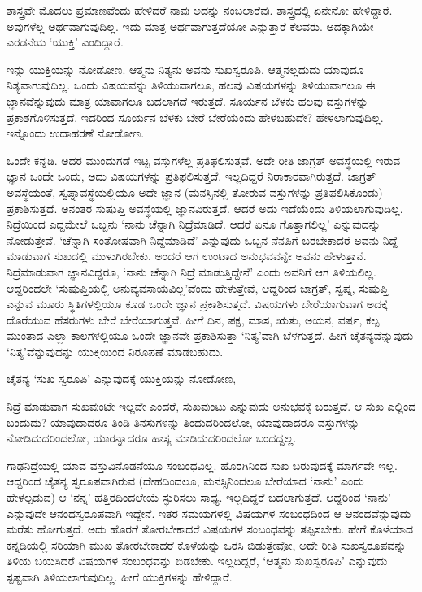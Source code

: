ಶಾಸ್ತ್ರವೇ ಮೊದಲು ಪ್ರಮಾಣವೆಂದು ಹೇಳಿದರೆ ನಾವು ಅದನ್ನು ನಂಬಲಾರೆವು. ಶಾಸ್ತ್ರದಲ್ಲಿ ಏನೇನೋ ಹೇಳಿದ್ದಾರೆ. ಅವುಗಳೆಲ್ಲ ಅರ್ಥವಾಗುವುದಿಲ್ಲ. ಇದು ಮಾತ್ರ ಅರ್ಥವಾಗುತ್ತದೆಯೋ ಎನ್ನುತ್ತಾರೆ ಕೆಲವರು. ಅದಕ್ಕಾಗಿಯೇ ಎರಡನೆಯ `ಯುಕ್ತಿ' ಎಂದಿದ್ದಾರೆ.

ಇನ್ನು ಯುಕ್ತಿಯನ್ನು ನೋಡೋಣ. ಆತ್ಮನು ನಿತ್ಯನು ಅವನು ಸುಖಸ್ವರೂಪಿ. ಆತ್ಮನಲ್ಲದುದು ಯಾವುದೂ ನಿತ್ಯವಾಗುವುದಿಲ್ಲ. ಒಂದು ವಿಷಯವನ್ನು ತಿಳಿಯುವಾಗಲೂ, ಹಲವು ವಿಷಯಗಳನ್ನು ತಿಳಿಯುವಾಗಲೂ ಈ ಜ್ಞಾನವೆನ್ನುವುದು ಮಾತ್ರ ಯಾವಾಗಲೂ ಬದಲಾಗದೆ ಇರುತ್ತದೆ. ಸೂರ್ಯನ ಬೆಳಕು ಹಲವು ವಸ್ತುಗಳನ್ನು ಪ್ರಕಾಶಗೊಳಿಸುತ್ತದೆ. ಇದರಿಂದ ಸೂರ್ಯನ ಬೆಳಕು ಬೇರೆ ಬೇರೆಯೆಂದು ಹೇಳಬಹುದೇ? ಹೇಳಲಾಗುವುದಿಲ್ಲ. ಇನ್ನೊಂದು ಉದಾಹರಣೆ ನೋಡೋಣ.

ಒಂದೇ ಕನ್ನಡಿ. ಅದರ ಮುಂದುಗಡೆ ಇಟ್ಟ ವಸ್ತುಗಳೆಲ್ಲ ಪ್ರತಿಫಲಿಸುತ್ತವೆ. ಅದೇ ರೀತಿ ಜಾಗ್ರತ್ ಅವಸ್ಥೆಯಲ್ಲಿ ಇರುವ ಜ್ಞಾನ ಒಂದೇ ಒಂದು, ಅದು ವಿಷಯಗಳನ್ನು ಪ್ರತಿಫಲಿಸುತ್ತದೆ. ಇಲ್ಲದಿದ್ದರೆ ನಿರಾಕಾರವಾಗಿರುತ್ತದೆ. ಜಾಗ್ರತ್ ಅವಸ್ಥೆಯಂತೆ, ಸ್ವಪ್ನಾವಸ್ಥೆಯಲ್ಲಿಯೂ ಅದೇ ಜ್ಞಾನ (ಮನಸ್ಸಿನಲ್ಲಿ ತೋರುವ ವಸ್ತುಗಳನ್ನು ಪ್ರತಿಫಲಿಸಿಕೊಂಡು) ಪ್ರಕಾಶಿಸುತ್ತದೆ. ಅನಂತರ ಸುಷುಪ್ತಿ ಅವಸ್ಥೆಯಲ್ಲಿ ಜ್ಞಾನವಿರುತ್ತದೆ. ಆದರೆ ಅದು ಇದೆಯೆಂದು ತಿಳಿಯಲಾಗುವುದಿಲ್ಲ. ನಿದ್ರೆಯಿಂದ ಎದ್ದಮೇಲೆ ಒಬ್ಬನು `ನಾನು ಚೆನ್ನಾಗಿ ನಿದ್ರೆಮಾಡಿದೆ. ಆದರೆ ಏನೂ ಗೊತ್ತಾಗಲಿಲ್ಲ' ಎನ್ನುವುದನ್ನು ನೋಡುತ್ತೇವೆ. `ಚೆನ್ನಾಗಿ ಸಂತೋಷವಾಗಿ ನಿದ್ದೆಮಾಡಿದೆ' ಎನ್ನುವುದು ಒಬ್ಬನ ನೆನಪಿಗೆ ಬರಬೇಕಾದರೆ ಅವನು ನಿದ್ದೆ ಮಾಡುವಾಗ ಸುಖದಲ್ಲಿ ಮುಳುಗಿರಬೇಕು. ಅಂದರೆ ಆಗ ಉಂಟಾದ ಅನುಭವವನ್ನೇ ಅವನು ಹೇಳುತ್ತಾನೆ. ನಿದ್ರೆಮಾಡುವಾಗ ಜ್ಞಾನವಿದ್ದರೂ, `ನಾನು ಚೆನ್ನಾಗಿ ನಿದ್ರೆ ಮಾಡುತ್ತಿದ್ದೇನೆ' ಎಂದು ಅವನಿಗೆ ಆಗ ತಿಳಿಯಲಿಲ್ಲ. ಆದ್ದರಿಂದಲೇ `ಸುಷುಪ್ತಿಯಲ್ಲಿ ಅನುವ್ಯವಸಾಯವಿಲ್ಲ'ವೆಂದು ಹೇಳುತ್ತೇವೆ, ಆದ್ದರಿಂದ ಜಾಗ್ರತ್, ಸ್ವಪ್ನ, ಸುಷುಪ್ತಿ ಎನ್ನುವ ಮೂರು ಸ್ಥಿತಿಗಳಲ್ಲಿಯೂ ಕೂಡ ಒಂದೇ ಜ್ಞಾನ ಪ್ರಕಾಶಿಸುತ್ತದೆ. ವಿಷಯಗಳು ಬೇರೆಯಾಗುವಾಗ ಅದಕ್ಕೆ ದೊರೆಯುವ ಹೆಸರುಗಳು ಬೇರೆ ಬೇರೆಯಾಗುತ್ತವೆ. ಹೀಗೆ ದಿನ, ಪಕ್ಷ, ಮಾಸ, ಋತು, ಅಯನ, ವರ್ಷ, ಕಲ್ಪ ಮುಂತಾದ ಎಲ್ಲಾ ಕಾಲಗಳಲ್ಲಿಯೂ ಒಂದೇ ಜ್ಞಾನವೇ ಪ್ರಕಾಶಿಸುತ್ತಾ `ನಿತ್ಯ'ವಾಗಿ ಬೆಳಗುತ್ತದೆ. ಹೀಗೆ ಚೈತನ್ಯವೆನ್ನುವುದು `ನಿತ್ಯ'ವೆನ್ನುವುದನ್ನು ಯುಕ್ತಿಯಿಂದ ನಿರೂಪಣೆ ಮಾಡಬಹುದು.

ಚೈತನ್ಯ `ಸುಖ ಸ್ವರೂಪಿ' ಎನ್ನುವುದಕ್ಕೆ ಯುಕ್ತಿಯನ್ನು ನೋಡೋಣ,

ನಿದ್ರೆ ಮಾಡುವಾಗ ಸುಖವುಂಟೇ ಇಲ್ಲವೇ ಎಂದರೆ, ಸುಖವುಂಟು ಎನ್ನುವುದು ಅನುಭವಕ್ಕೆ ಬರುತ್ತದೆ. ಆ ಸುಖ ಎಲ್ಲಿಂದ ಬಂದುದು? ಯಾವುದಾದರೂ ತಿಂಡಿ ತಿನಸುಗಳನ್ನು ತಿಂದುದರಿಂದಲೋ, ಯಾವುದಾದರೂ ವಸ್ತುಗಳನ್ನು ನೋಡಿದುದರಿಂದಲೋ, ಯಾರನ್ನಾದರೂ ಹಾಸ್ಯ ಮಾಡಿದುದರಿಂದಲೋ ಬಂದದ್ದಲ್ಲ.

ಗಾಢನಿದ್ರೆಯಲ್ಲಿ ಯಾವ ವಸ್ತುವಿನೊಡನೆಯೂ ಸಂಬಂಧವಿಲ್ಲ. ಹೊರಗಿನಿಂದ ಸುಖ ಬರುವುದಕ್ಕೆ ಮಾರ್ಗವೇ ಇಲ್ಲ. ಆದ್ದರಿಂದ ಚೈತನ್ಯ ಸ್ವರೂಪವಾಗಿರುವ (ದೇಹದಿಂದಲೂ, ಮನಸ್ಸಿನಿಂದಲೂ ಬೇರೆಯಾದ `ನಾನು' ಎಂದು ಹೇಳಲ್ಪಡುವ) ಆ `ನನ್ನ' ಹತ್ತಿರದಿಂದಲೇಯೆ ಸ್ಫುರಿಸಲು ಸಾಧ್ಯ. ಇಲ್ಲದಿದ್ದರೆ ಬದಲಾಗುತ್ತದೆ. ಆದ್ದರಿಂದ `ನಾನು' ಎನ್ನುವುದೇ ಆನಂದಸ್ವರೂಪವಾಗಿ ಇದ್ದೇನೆ. ಇತರ ಸಮಯಗಳಲ್ಲಿ ವಿಷಯಗಳ ಸಂಬಂಧದಿಂದ ಆ ಆನಂದವೆನ್ನುವುದು ಮರೆತು ಹೋಗುತ್ತದೆ. ಅದು ಹೊರಗೆ ತೋರಬೇಕಾದರೆ ವಿಷಯಗಳ ಸಂಬಂಧವನ್ನು ತಪ್ಪಿಸಬೇಕು. ಹೇಗೆ ಕೊಳೆಯಾದ ಕನ್ನಡಿಯಲ್ಲಿ ಸರಿಯಾಗಿ ಮುಖ ತೋರಬೇಕಾದರೆ ಕೊಳೆಯನ್ನು ಒರಸಿ ಬಿಡುತ್ತೇವೋ, ಅದೇ ರೀತಿ ಸುಖಸ್ವರೂಪವನ್ನು ತಿಳಿಯ ಬಯಸಿದರೆ ವಿಷಯಗಳ ಸಂಬಂಧವನ್ನು ಬಿಡಬೇಕು. ಇಲ್ಲದಿದ್ದರೆ, `ಆತ್ಮನು ಸುಖಸ್ವರೂಪಿ' ಎನ್ನುವುದು ಸ್ಪಷ್ಟವಾಗಿ ತಿಳಿಯಲಾಗುವುದಿಲ್ಲ. ಹೀಗೆ ಯುಕ್ತಿಗಳನ್ನು ಹೇಳಿದ್ದಾರೆ.

